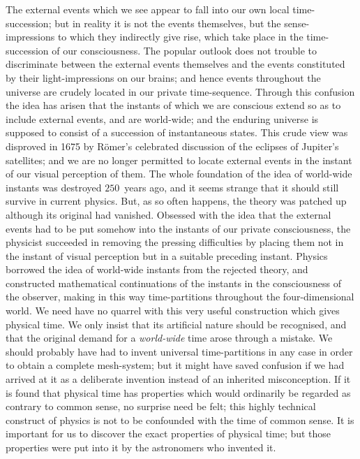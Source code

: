 \documentclass[12pt]{book}
\begin{document}
The external events which we see appear to fall into our own local
time-succession; but in reality it is not the events themselves, but the
sense-impressions to which they indirectly give rise, which take place in the
time-succession of our consciousness. The popular outlook does not trouble to
discriminate between the external events themselves and the events constituted
by their light-impressions on our brains; and hence events throughout the
universe are crudely located in our private time-sequence. Through this confusion
the idea has arisen that the instants of which we are conscious extend
so as to include external events, and are world-wide; and the enduring universe
is supposed to consist of a succession of instantaneous states. This crude view
was disproved in 1675 by Römer's celebrated discussion of the eclipses of
Jupiter's satellites; and we are no longer permitted to locate external events
in the instant of our visual perception of them. The whole foundation of the
idea of world-wide instants was destroyed $250$~years ago, and it seems strange
that it should still survive in current physics. But, as so often happens, the
theory was patched up although its original  had vanished. Obsessed
with the idea that the external events had to be put somehow into the
instants of our private consciousness, the physicist succeeded in removing
the pressing difficulties by placing them not in the instant of visual perception
but in a suitable preceding instant. Physics borrowed the idea of world-wide
instants from the rejected theory, and constructed mathematical continuations
of the instants in the consciousness of the observer, making in this way time-partitions
throughout the four-dimensional world. We need have no quarrel
with this very useful construction which gives physical time. We only insist
that its artificial nature should be recognised, and that the original demand
for a \emph{world-wide} time arose through a mistake. We should probably have
had to invent universal time-partitions in any case in order to obtain a complete
mesh-system; but it might have saved confusion if we had arrived at it
as a deliberate invention instead of an inherited misconception. If it is found
that physical time has properties which would ordinarily be regarded as contrary
to common sense, no surprise need be felt; this highly technical construct
of physics is not to be confounded with the time of common sense. It is important
for us to discover the exact properties of physical time; but those
properties were put into it by the astronomers who invented it.
\end{document}
